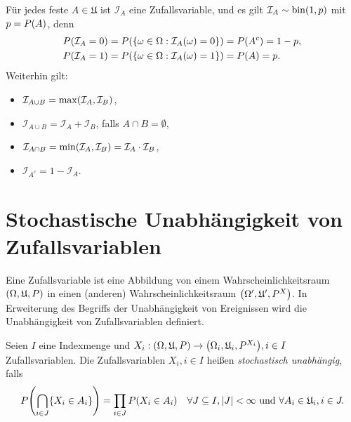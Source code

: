 \documentclass{lecture}
\begin{document}
    \begin{remark}
        Für jedes feste \(A \in \mathfrak{U}\) ist \(\mathcal{I}_A\) eine Zufallsvariable, und es gilt \(\mathcal{I}_A \sim \bin\parentheses*{1, p}\) mit \(p = P\parentheses*{A}\), denn
        \begin{align*}
            P\parentheses*{\mathcal{I}_A = 0} &= P\parentheses*{\braces*{\omega \in \Omega : \mathcal{I}_A\parentheses*{\omega} = 0}} = P\parentheses*{A^c} = 1 - p,\\
            P\parentheses*{\mathcal{I}_A = 1} &= P\parentheses*{\braces*{\omega \in \Omega : \mathcal{I}_A\parentheses*{\omega} = 1}} = P\parentheses*{A} = p.
        \end{align*}
        Weiterhin gilt:
        \begin{itemize}
            \item \(\mathcal{I}_{A \cup B} = \max\parentheses*{\mathcal{I}_A, \mathcal{I}_B}\),
            \item \(\mathcal{I}_{A \cup B} = \mathcal{I}_A + \mathcal{I}_B\), falls \(A \cap B = \emptyset\),
            \item \(\mathcal{I}_{A \cap B} = \min\parentheses*{\mathcal{I}_A, \mathcal{I}_B} = \mathcal{I}_A \cdot \mathcal{I}_B\),
            \item \(\mathcal{I}_{A^c} = 1 - \mathcal{I}_A\).
        \end{itemize}
    \end{remark}


    \section*{Stochastische Unabhängigkeit von Zufallsvariablen}

    Eine Zufallsvariable ist eine Abbildung von einem Wahrscheinlichkeitsraum \(\parentheses*{\Omega, \mathfrak{U}, P}\) in einen (anderen) Wahrscheinlichkeitsraum \(\parentheses*{\Omega', \mathfrak{U}', P^X}\).
    In Erweiterung des Begriffs der Unabhängigkeit von Ereignissen wird die Unabhängigkeit von Zufallsvariablen definiert.

    \begin{definition}
        Seien \(I\) eine Indexmenge und \(X_i: \parentheses*{\Omega, \mathfrak{U}, P} \to \parentheses*{\Omega_i, \mathfrak{U}_i, P^{X_i}}, i \in I\) Zufallsvariablen.
        Die Zufallsvariablen \(X_i, i \in I\) heißen \emph{stochastisch unabhängig}, falls
        \[
            P\parentheses*{\bigcap_{i \in J}\braces*{X_i \in A_i}} = \prod_{i \in J}P\parentheses*{X_i \in A_i} \quad \forall J \subseteq I, \absolute*{J} < \infty\text{ und }\forall A_i \in \mathfrak{U}_i, i \in J.
        \]
    \end{definition}
\end{document}
